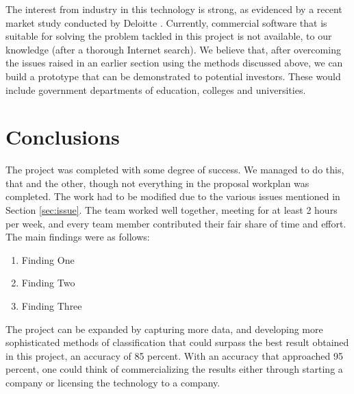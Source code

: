 \documentclass[12pt,a4paper]{article}
\begin{document}
	The interest from industry in this technology is strong, as evidenced by a recent market study conducted by Deloitte \cite{latexcompanion}. Currently, commercial software that is suitable for solving the problem tackled in this project is not available, to our knowledge (after a thorough Internet search). We believe that, after overcoming the issues raised in an earlier section using the methods discussed above, we can build a prototype that can be demonstrated to potential investors. These would include government departments of education, colleges and universities.
	
	\section{Conclusions}
	The project was completed with some degree of success. We managed to do this, that and the other, though not everything in the proposal workplan was completed. The work had to be modified due to the various issues mentioned in Section \ref{sec:issue}. The team worked well together, meeting for at least 2 hours per week, and every team member contributed their fair share of time and effort. The main findings were as follows:
	\begin{enumerate}
		\item Finding One
		\item Finding Two
		\item Finding Three
	\end{enumerate}

	The project can be expanded by capturing more data, and developing more sophisticated methods of classification that could surpass the best result obtained in this project, an accuracy of 85 percent. With an accuracy that approached 95 percent, one could think of commercializing the results either through starting a company or licensing the technology to a company.
		
	
	
	
	
	
\end{document}
